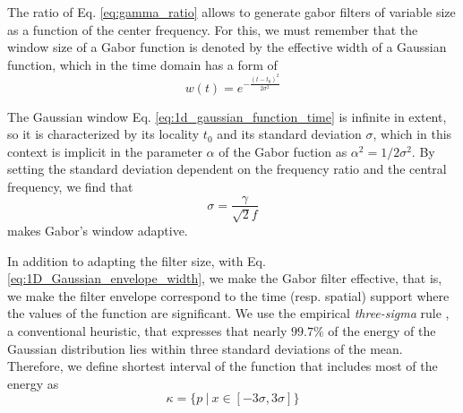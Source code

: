 The ratio of Eq. \ref{eq:gamma_ratio} allows to generate gabor filters of variable size as a function of the center frequency. For this, we must remember that the window size of a Gabor function is denoted by the effective width of a Gaussian function, which in the time domain has a form of
\begin{equation}\label{eq:1d_gaussian_function_time}
    w(t)=e^{-\frac{(t-t_0)^2}{2\sigma^2}}
\end{equation}

The Gaussian window Eq. \ref{eq:1d_gaussian_function_time} is infinite in extent, so it is characterized by its locality $t_0$ and its standard deviation $\sigma$, which in this context is implicit in the parameter $\alpha$ of the Gabor fuction as $\alpha^2 = 1 / 2 \sigma^2$. By setting the standard deviation dependent on the frequency ratio and the central frequency, we find that
\begin{equation}
	\sigma = \frac{\gamma}{\sqrt{2}f} \label{eq:1D_Gaussian_envelope_width}
\end{equation} 
makes Gabor's window adaptive.

In addition to adapting the filter size, with Eq. \eqref{eq:1D_Gaussian_envelope_width}, we make the Gabor filter effective, that is, we make the filter envelope correspond to the time (resp. spatial) support where the values of the function are significant. We use the empirical \textit{three-sigma} rule \cite{Pukelsheim:AMSTAT:1994}, a conventional heuristic, that expresses that nearly $99.7\%$ of the energy of the Gaussian distribution lies within three standard deviations of the mean. Therefore, we define shortest interval of the function that includes most of the energy as 
\begin{equation}
	\kappa = \lbrace p ~|~ x \in [-3\sigma, 3\sigma] \rbrace \label{eq:1D_gabor_support}
\end{equation}

